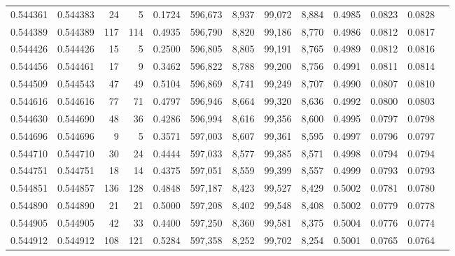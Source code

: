 \begin{tabular}{rrrrrrrrrrrrr}
0.544361 & 0.544383 &    24 &     5 &                                     0.1724 & 596,673 &   8,937 &  99,072 &   8,884 & 0.4985 & 0.0823 & 0.0828 \\
0.544389 & 0.544389 &   117 &   114 &                                     0.4935 & 596,790 &   8,820 &  99,186 &   8,770 & 0.4986 & 0.0812 & 0.0817 \\
0.544426 & 0.544426 &    15 &     5 &                                     0.2500 & 596,805 &   8,805 &  99,191 &   8,765 & 0.4989 & 0.0812 & 0.0816 \\
0.544456 & 0.544461 &    17 &     9 &                                     0.3462 & 596,822 &   8,788 &  99,200 &   8,756 & 0.4991 & 0.0811 & 0.0814 \\
0.544509 & 0.544543 &    47 &    49 &                                     0.5104 & 596,869 &   8,741 &  99,249 &   8,707 & 0.4990 & 0.0807 & 0.0810 \\
0.544616 & 0.544616 &    77 &    71 &                                     0.4797 & 596,946 &   8,664 &  99,320 &   8,636 & 0.4992 & 0.0800 & 0.0803 \\
0.544630 & 0.544690 &    48 &    36 &                                     0.4286 & 596,994 &   8,616 &  99,356 &   8,600 & 0.4995 & 0.0797 & 0.0798 \\
0.544696 & 0.544696 &     9 &     5 &                                     0.3571 & 597,003 &   8,607 &  99,361 &   8,595 & 0.4997 & 0.0796 & 0.0797 \\
0.544710 & 0.544710 &    30 &    24 &                                     0.4444 & 597,033 &   8,577 &  99,385 &   8,571 & 0.4998 & 0.0794 & 0.0794 \\
0.544751 & 0.544751 &    18 &    14 &                                     0.4375 & 597,051 &   8,559 &  99,399 &   8,557 & 0.4999 & 0.0793 & 0.0793 \\
0.544851 & 0.544857 &   136 &   128 &                                     0.4848 & 597,187 &   8,423 &  99,527 &   8,429 & 0.5002 & 0.0781 & 0.0780 \\
0.544890 & 0.544890 &    21 &    21 &                                     0.5000 & 597,208 &   8,402 &  99,548 &   8,408 & 0.5002 & 0.0779 & 0.0778 \\
0.544905 & 0.544905 &    42 &    33 &                                     0.4400 & 597,250 &   8,360 &  99,581 &   8,375 & 0.5004 & 0.0776 & 0.0774 \\
0.544912 & 0.544912 &   108 &   121 &                                     0.5284 & 597,358 &   8,252 &  99,702 &   8,254 & 0.5001 & 0.0765 & 0.0764 \\

\end{tabular}
